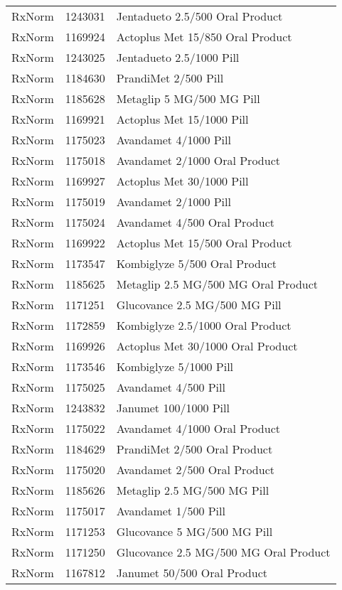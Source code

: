 \begin{longtable}{p{}p{}p{}}
  RxNorm & 1243031 & Jentadueto 2.5/500 Oral Product \\ 
  RxNorm & 1169924 & Actoplus Met 15/850 Oral Product \\ 
  RxNorm & 1243025 & Jentadueto 2.5/1000 Pill \\ 
  RxNorm & 1184630 & PrandiMet 2/500 Pill \\ 
  RxNorm & 1185628 & Metaglip 5 MG/500 MG Pill \\ 
  RxNorm & 1169921 & Actoplus Met 15/1000 Pill \\ 
  RxNorm & 1175023 & Avandamet 4/1000 Pill \\ 
  RxNorm & 1175018 & Avandamet 2/1000 Oral Product \\ 
  RxNorm & 1169927 & Actoplus Met 30/1000 Pill \\ 
  RxNorm & 1175019 & Avandamet 2/1000 Pill \\ 
  RxNorm & 1175024 & Avandamet 4/500 Oral Product \\ 
  RxNorm & 1169922 & Actoplus Met 15/500 Oral Product \\ 
  RxNorm & 1173547 & Kombiglyze 5/500 Oral Product \\ 
  RxNorm & 1185625 & Metaglip 2.5 MG/500 MG Oral Product \\ 
  RxNorm & 1171251 & Glucovance 2.5 MG/500 MG Pill \\ 
  RxNorm & 1172859 & Kombiglyze 2.5/1000 Oral Product \\ 
  RxNorm & 1169926 & Actoplus Met 30/1000 Oral Product \\ 
  RxNorm & 1173546 & Kombiglyze 5/1000 Pill \\ 
  RxNorm & 1175025 & Avandamet 4/500 Pill \\ 
  RxNorm & 1243832 & Janumet 100/1000 Pill \\ 
  RxNorm & 1175022 & Avandamet 4/1000 Oral Product \\ 
  RxNorm & 1184629 & PrandiMet 2/500 Oral Product \\ 
  RxNorm & 1175020 & Avandamet 2/500 Oral Product \\ 
  RxNorm & 1185626 & Metaglip 2.5 MG/500 MG Pill \\ 
  RxNorm & 1175017 & Avandamet 1/500 Pill \\ 
  RxNorm & 1171253 & Glucovance 5 MG/500 MG Pill \\ 
  RxNorm & 1171250 & Glucovance 2.5 MG/500 MG Oral Product \\ 
  RxNorm & 1167812 & Janumet 50/500 Oral Product \\ 

\end{longtable}
